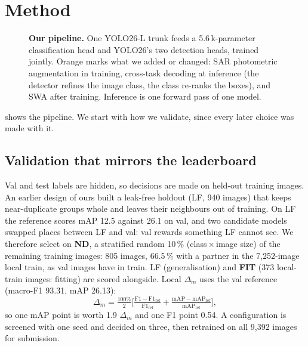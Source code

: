 \section{Method}
\label{sec:method}

\begin{figure}[t]
  \centering
  
  \vspace{-1mm}
  \caption{\textbf{Our pipeline.} One YOLO26-L trunk feeds a 5.6\,k-parameter classification head and YOLO26's two
  detection heads, trained jointly. Orange marks what we added or changed: SAR photometric augmentation in training,
  cross-task decoding at inference (the detector refines the image class, the class re-ranks the boxes), and SWA after
  training. Inference is one forward pass of one model.}
  \label{fig:pipeline}
\end{figure}

 shows the pipeline.
We start with how we validate, since every later choice was made with it.

\subsection{Validation that mirrors the leaderboard}
\label{sec:protocol}
Val and test labels are hidden, so decisions are made on held-out training images.
An earlier design of ours built a leak-free holdout (LF, 940 images) that keeps near-duplicate groups whole and leaves
their neighbours out of training.
On LF the reference scores mAP 12.5 against 26.1 on val, and two candidate models swapped places between LF and val:
val rewards something LF cannot see.
We therefore select on \textbf{ND}, a stratified random 10\,\% (class\,$\times$\,image size) of the remaining training
images: 805 images, 66.5\,\% with a partner in the 7{,}252-image local train, as val images have in train.
LF (generalisation) and \textbf{FIT} (373 local-train images: fitting) are scored alongside.
Local $\Delta_m$ uses the val reference (macro-F1 93.31, mAP 26.13):
\begin{equation}
  \Delta_m=\tfrac{100\%}{2}\Big[\tfrac{\mathrm{F1}-\mathrm{F1}_\text{ref}}{\mathrm{F1}_\text{ref}}
  +\tfrac{\mathrm{mAP}-\mathrm{mAP}_\text{ref}}{\mathrm{mAP}_\text{ref}}\Big],
  \label{eq:dm}
\end{equation}
so one mAP point is worth 1.9 $\Delta_m$ and one F1 point 0.54.
A configuration is screened with one seed and decided on three, then retrained on all 9{,}392 images for submission.

